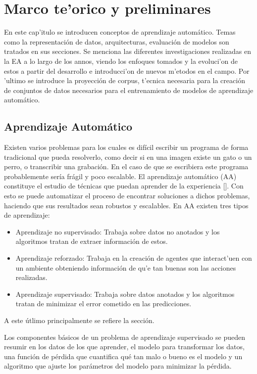 \chapter{Marco te'orico y preliminares}\label{chapter:background}

En este cap'itulo se introducen conceptos de aprendizaje automático. Temas
como la representación de datos, arquitecturas, evaluación de modelos son tratados en sus secciones.
Se menciona las diferentes investigaciones realizadas en la EA a lo largo de los annos, viendo
los enfoques tomados y la evoluci'on de estos a partir del desarrollo e introducci'on de nuevos m'etodos en el
campo. Por 'ultimo se introduce la proyección de corpus, t'ecnica necesaria para la creación de conjuntos 
de datos necesarios para el entrenamiento de modelos de aprendizaje automático.

\section{Aprendizaje Automático}

Existen varios problemas para los cuales es difícil escribir un programa de forma tradicional que pueda
resolverlo, como decir si en una imagen existe un gato o un perro, o transcribir una grabación. En el caso
de que se escribiera este programa probablemente sería frágil y poco escalable. El aprendizaje automático
(AA) constituye el estudio de técnicas que puedan 
aprender de la experiencia [\cite{d2l}]. Con esto se puede automatizar el proceso de encontrar soluciones a 
dichos problemas, haciendo que sus resultados sean robustos y escalables. En AA existen tres tipos de 
aprendizaje:
\begin{itemize}
	\item Aprendizaje no supervisado: Trabaja sobre datos no anotados y los algoritmos tratan de 
	extraer información de estos.
	\item Aprendizaje reforzado: Trabaja en la creación de agentes que interact'uen con 
	un ambiente obteniendo información de qu'e tan buenas son las acciones realizadas.
	\item Aprendizaje supervisado: Trabaja sobre datos anotados y los algoritmos tratan de minimizar
	el error cometido en las predicciones.
\end{itemize}
A este útlimo principalmente se refiere la sección.

Los componentes básicos de un problema de aprendizaje supervisado se pueden resumir en los datos de los que 
aprender, el modelo para transformar los datos, una función de pérdida que cuantifica qué tan malo o bueno es el 
modelo y un algoritmo que ajuste los parámetros del modelo para minimizar la pérdida.

